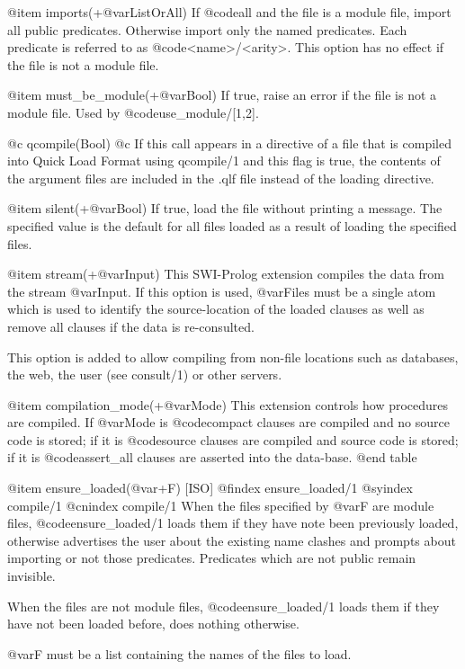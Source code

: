 {{{{@item imports(+@var{ListOrAll})
    If @code{all} and the file is a module file, import all public
    predicates. Otherwise import only the named predicates. Each
    predicate is referred to as @code{<name>/<arity>}. This option has
    no effect if the file is not a module file.

@item must_be_module(+@var{Bool})
    If true, raise an error if the file is not a module file. Used by
    @code{use_module/[1,2]}.

@c qcompile(Bool)
@c     If this call appears in a directive of a file that is compiled into Quick Load Format using qcompile/1 and this flag is true, the contents of the argument files are included in the .qlf file instead of the loading directive.

@item silent(+@var{Bool})
    If true, load the file without printing a message. The specified value is the default for all files loaded as a result of loading the specified files.

@item stream(+@var{Input})
    This SWI-Prolog extension compiles the data from the stream
    @var{Input}. If this option is used, @var{Files} must be a single
    atom which is used to identify the source-location of the loaded
    clauses as well as remove all clauses if the data is re-consulted.

    This option is added to allow compiling from non-file locations such as databases, the web, the user (see consult/1) or other servers. 

@item compilation_mode(+@var{Mode})
    This extension controls how procedures are compiled. If @var{Mode}
    is @code{compact} clauses are compiled and no source code is stored;
    if it is @code{source} clauses are compiled and source code is stored;
    if it is @code{assert_all} clauses are asserted into the data-base.
@end table

@item ensure_loaded(@var{+F}) [ISO]
@findex ensure_loaded/1
@syindex compile/1
@cnindex compile/1
When the files specified by @var{F} are module files,
@code{ensure_loaded/1} loads them if they have note been previously
loaded, otherwise advertises the user about the existing name clashes
and prompts about importing or not those predicates. Predicates which
are not public remain invisible.

When the files are not module files, @code{ensure_loaded/1} loads them
if they have not been loaded before, does nothing otherwise.

@var{F} must be a list containing the names of the files to load.

}}}}
